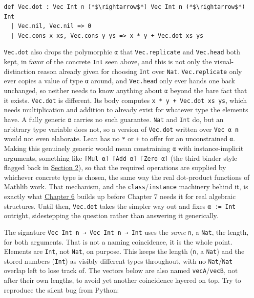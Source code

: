 \begin{lstlisting}
def Vec.dot : Vec Int n (*$\rightarrow$*) Vec Int n (*$\rightarrow$*) Int
  | Vec.nil, Vec.nil => 0
  | Vec.cons x xs, Vec.cons y ys => x * y + Vec.dot xs ys
\end{lstlisting}

\texttt{Vec.dot} also drops the polymorphic \texttt{α} that \texttt{Vec.replicate} and \texttt{Vec.head} both kept, in favor of the concrete \texttt{Int} seen above, and this is not only the visual-distinction reason already given for choosing \texttt{Int} over \texttt{Nat}. \texttt{Vec.replicate} only ever copies a value of type \texttt{α} around, and \texttt{Vec.head} only ever hands one back unchanged, so neither needs to know anything about \texttt{α} beyond the bare fact that it exists. \texttt{Vec.dot} is different. Its body computes \texttt{x * y + Vec.dot xs ys}, which needs multiplication and addition to already exist for whatever type the elements have. A fully generic \texttt{α} carries no such guarantee. \texttt{Nat} and \texttt{Int} do, but an arbitrary type variable does not, so a version of \texttt{Vec.dot} written over \texttt{Vec α n} would not even elaborate. Lean has no \texttt{*} or \texttt{+} to offer for an unconstrained \texttt{α}. Making this genuinely generic would mean constraining \texttt{α} with instance-implicit arguments, something like \texttt{[Mul α] [Add α] [Zero α]} (the third binder style flagged back in \hyperref[sec:01-basics:02-def-let-implicit:1]{Section 2}), so that the required operations are supplied by whichever concrete type is chosen, the same way the real dot-product functions of Mathlib work. That mechanism, and the \texttt{class}/\texttt{instance} machinery behind it, is exactly what \hyperref[sec:06-rigor-check:01-structure-vs-class:1]{Chapter 6} builds up before Chapter 7 needs it for real algebraic structures. Until then, \texttt{Vec.dot} takes the simpler way out and fixes \texttt{α := Int} outright, sidestepping the question rather than answering it generically.

The signature \texttt{Vec Int n → Vec Int n → Int} uses the \emph{same} \texttt{n}, a \texttt{Nat}, the length, for both arguments. That is not a naming coincidence, it is the whole point. Elements are \texttt{Int}, not \texttt{Nat}, on purpose. This keeps the length (\texttt{n}, a \texttt{Nat}) and the stored numbers (\texttt{Int}) as visibly different types throughout, with no \texttt{Nat}/\texttt{Nat} overlap left to lose track of. The vectors below are also named \texttt{vecA}/\texttt{vecB}, not after their own lengths, to avoid yet another coincidence layered on top. Try to reproduce the silent bug from Python:

